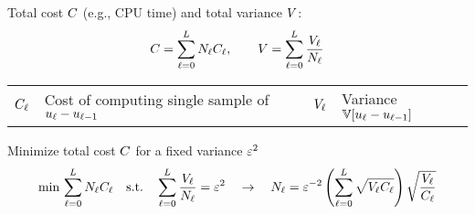 \begin{frame}{\name{}}
    \begin{squarelist}
        \item<1-> Total cost $C$ (e.g., CPU time) and total variance $V$:
        \begin{equation*}
            C = \sum_{\ell = 0}^L N_\ell C_\ell, \qquad V = \sum_{\ell = 0}^L\frac{V_\ell}{N_\ell}
        \end{equation*}
        \vspace{-1.5em}
        \begin{block}{}
            \begin{centering}
                \begin{tabular}{r|lcr|l}
                    $C_\ell$ & Cost of computing single sample of $u_\ell - u_{\ell-1}$ & &
                    $V_\ell$ & Variance $\mathbb{V}[u_\ell - u_{\ell-1}]$
                \end{tabular}
            \end{centering}
        \end{block}
        \vspace{0.5em}
        \item<2-> Minimize total cost $C$ for a fixed variance $\varepsilon^2$
            \begin{equation*}
                \min\, \sum_{\ell = 0}^L N_\ell C_\ell \quad \text{s.t.} \quad \sum_{\ell = 0}^L\frac{V_\ell}{N_\ell} = \varepsilon^2 \quad \rightarrow \quad N_\ell = \varepsilon^{-2}\left(\sum_{\ell = 0}^L \sqrt{V_\ell C_\ell}\right)\sqrt{\frac{V_\ell}{C_\ell}}
            \end{equation*}
    \end{squarelist}
\end{frame}

